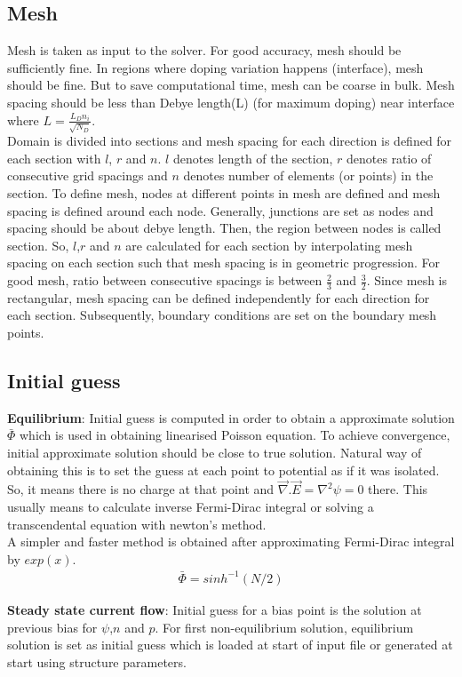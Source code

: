 \subsection{Mesh}
Mesh is taken as input to the solver. For good accuracy, mesh should be sufficiently fine. In regions where doping variation happens (interface), mesh should be fine. But to save computational time, mesh can be coarse in bulk. Mesh spacing should be less than Debye length(L) (for maximum doping) near interface where $L=\frac{L_D n_i}{\sqrt{N_D}}$.\\ Domain is divided into sections and mesh spacing for each direction is defined for each section with $l$, $r$ and $n$. $l$ denotes length of the section, $r$ denotes ratio of consecutive grid spacings and $n$ denotes number of elements (or points) in the section. To define mesh, nodes at different points in mesh are defined and mesh spacing is defined around each node. Generally, junctions are set as nodes and spacing should be about debye length. Then, the region between nodes is called section. So, $l$,$r$ and $n$ are calculated for each section by interpolating mesh spacing on each section such that mesh spacing is in geometric progression. For good mesh, ratio between consecutive spacings is between $\frac{2}{3}$ and $\frac{3}{2}$.
Since mesh is rectangular, mesh spacing can be defined independently for each direction for each section. Subsequently, boundary conditions are set on the boundary mesh points.

\subsection{Initial guess}
\textbf{Equilibrium}:
Initial guess is computed in order to obtain a approximate solution $\bar{\Phi}$ which is used in obtaining linearised Poisson equation. To achieve convergence, initial approximate solution should be close to true solution. Natural way of obtaining this is to set the guess at each point to potential as if it was isolated. So, it means there is no charge at that point and $\vec{\nabla}.\vec{E} = \nabla^2\psi = 0$ there. This usually means to calculate inverse Fermi-Dirac integral or solving a transcendental equation with newton's method.\\
A simpler and faster method is obtained after approximating Fermi-Dirac integral by $exp(x)$.
\begin{align*}
\bar{\Phi} = sinh^{-1}(N/2)
\end{align*}

\textbf{Steady state current flow}:
Initial guess for a bias point is the solution at previous bias for $\psi$,$n$ and $p$. For first non-equilibrium solution, equilibrium solution is set as initial guess which is loaded at start of input file or generated at start using structure parameters. 

